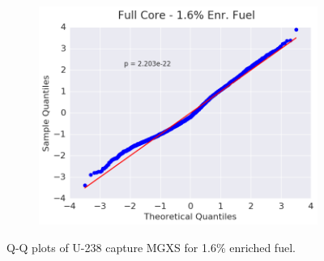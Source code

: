 \begin{figure}[h!]
\begin{subfigure}{0.5\textwidth}
  \includegraphics[width=\linewidth]{figures/patterns/full-core/quantile/16-enr-capt-1} \caption{}
  \label{fig:chap9-qq-full-core-1.6-capt}
\end{subfigure}
\caption[Q-Q plots of U-238 capture MGXS for 1.6\% enriched fuel]{Q-Q plots of U-238 capture \ac{MGXS} for 1.6\% enriched fuel.}
\label{fig:chap9-qq-1.6-capt}
\end{figure}


